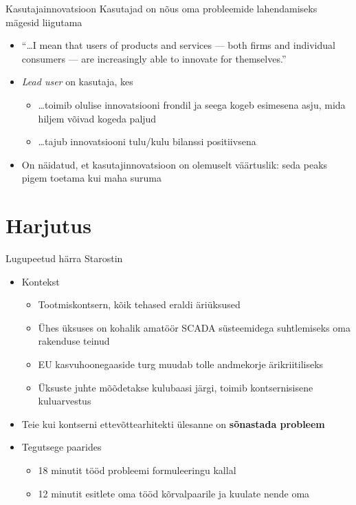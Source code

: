 \documentclass{beamer}
\begin{document}
\begin{frame}{Kasutajainnovatsioon}
Kasutajad on nõus oma probleemide lahendamiseks mägesid liigutama
	\begin{itemize}
		\item \enquote{\ldots  I mean that users of products and services --- both firms and individual consumers --- are increasingly able to innovate for themselves.}\cite{hippel}
		\item \emph{Lead user} on kasutaja, kes
		\begin{itemize}
			\item \ldots toimib olulise innovatsiooni frondil ja seega kogeb esimesena asju, mida hiljem võivad kogeda paljud
			\item \ldots tajub innovatsiooni tulu/kulu bilanssi positiivsena
		\end{itemize}
		\item On näidatud, et kasutajinnovatsioon on olemuselt väärtuslik: seda peaks pigem toetama kui maha suruma
	\end{itemize}
\end{frame}


\section{Harjutus}

\begin{frame}{Lugupeetud härra Starostin}

\begin{itemize}
	\item Kontekst
	\begin{itemize}
		\item Tootmiskontsern, kõik tehased eraldi äriüksused
		\item Ühes üksuses on kohalik amatöör SCADA süsteemidega suhtlemiseks oma rakenduse teinud
		\item EU kasvuhoonegaaside turg muudab tolle andmekorje ärikriitiliseks
		\item Üksuste juhte mõõdetakse kulubaasi järgi, toimib kontsernisisene kuluarvestus
	\end{itemize}
	\item Teie kui kontserni ettevõttearhitekti ülesanne on \textbf{sõnastada probleem}
	\item Tegutsege paarides
	\begin{itemize}
		\item 18 minutit tööd probleemi formuleeringu kallal
		\item 12 minutit esitlete oma tööd kõrvalpaarile ja kuulate nende oma
	\end{itemize}
\end{itemize}
\end{frame}
\end{document}
